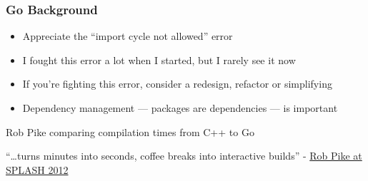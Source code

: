 {
  \color{solarizedBase2}
\begin{frame}
  \frametitle{Go Background}

  \begin{itemize}
    \item Appreciate the ``import cycle not allowed'' error
    \item I fought this error a lot when I started, but I rarely see it now
    \item If you're fighting this error, consider a redesign, refactor or simplifying
    \item Dependency management --- packages are dependencies --- is important
  \end{itemize}

  \vspace{1em}
  \small
  Rob Pike comparing compilation times from C++ to Go

  \vspace{1em}
  ``\dots turns minutes into seconds, coffee breaks into interactive builds''
  - \href{https://talks.golang.org/2012/splash.article}{Rob Pike at SPLASH 2012}
\end{frame}
}

